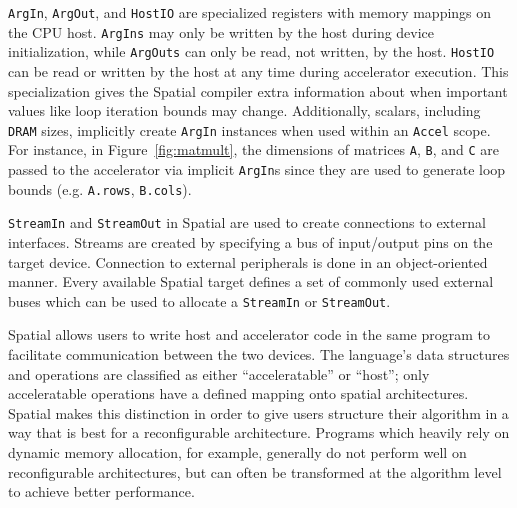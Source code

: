 \texttt{\small{ArgIn}}, \texttt{\small{ArgOut}}, and \texttt{\small{HostIO}} are specialized registers with memory mappings on the CPU host.
\texttt{\small{ArgIns}} may only be written by the host during device initialization, while \texttt{\small{ArgOuts}} can only be read, not written, by the host.
\texttt{\small{HostIO}} can be read or written by the host at any time during accelerator execution.
This specialization gives the Spatial compiler extra information about when important values like loop iteration bounds may change.
Additionally, scalars, including \texttt{\small{DRAM}} sizes, implicitly create \texttt{\small{ArgIn}} instances when used within an \texttt{\small{Accel}} scope. For instance, in Figure~\ref{fig:matmult}, the dimensions of matrices \texttt{\small{A}}, \texttt{\small{B}}, and \texttt{\small{C}} are passed to the accelerator via implicit \texttt{\small{ArgIn}}s
since they are used to generate loop bounds (e.g. \texttt{\small{A.rows}}, \texttt{\small{B.cols}}).


\texttt{\small{StreamIn}} and \texttt{\small{StreamOut}} in Spatial are used to create connections to external interfaces.
Streams are created by specifying a bus of input/output pins on the target device.
Connection to external peripherals is done in an object-oriented manner. Every available Spatial target defines a set of commonly used external buses which can be used to allocate a \texttt{\small{StreamIn}} or \texttt{\small{StreamOut}}. %

Spatial allows users to write host and accelerator code in the same program to facilitate communication between the two devices.
The language's data structures and operations are classified as either ``acceleratable'' or ``host''; only acceleratable operations have a defined mapping onto spatial architectures.
Spatial makes this distinction in order to give users structure their algorithm in a way that is best for a reconfigurable architecture.
Programs which heavily rely on dynamic memory allocation, for example, generally do not perform well on reconfigurable architectures, but can often be transformed at the algorithm level to achieve better performance.



